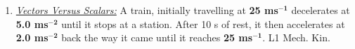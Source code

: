 \documentclass[A4,12pt]{article}
\begin{document}
\begin{enumerate}[label=\bfseries (\arabic*)]
%
%
%
%
%
%
%
%
%
%
%
%
%
%
%
%
%
%
%
%
%
%
%
%
%
%
%
%
%
%
%
%
%
%
%
%
%
%
%
%
%
%
%
%
%
%
%
%
%
%
%
%
%
%
%
%
%
%
%
%
%
%
%
%
%
%
%
%
%
%
%
%
%
%
%
%
%
%
%
%
%
%
%
%
%
%
%
%
%
%
%
%
%
%
%
%
%
%
%
%
%
%
%
%
%
%
%
%
%
%
%
\item \href{https://isaacphysics.org/questions/vector_scalar_train?board=aa9cd909-45d0-45da-921f-d2435c9b3afc}{\it Vectors Versus Scalars:} A train, initially travelling at \textbf{25 ms}$\bm{^{-1}}$ decelerates at \textbf{5.0 ms}$\bm{^{-2}}$ until it stops at a station. After 10 s of rest, it then accelerates at \textbf{2.0 ms}$\bm{^{-2}}$  back the way it came until it reaches \textbf{25 ms}$\bm{^{-1}}$.  \cite{Jardine-Wright} L1 Mech. Kin.

\end{enumerate}
\end{document}
